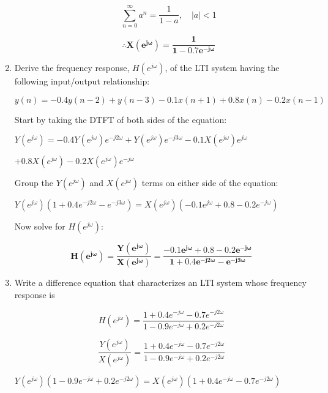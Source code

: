 \documentclass[fleqn]{article}
\begin{document}
\begin{enumerate}[nolistsep]
\begin{enumerate}[nolistsep]
					\begin{equation*}
						\sum_{n=0}^{\infty}a^n = \frac{1}{1-a},\quad |a| < 1
					\end{equation*}
					
					\begin{equation*}
						\mathbf{\therefore X(e^{j\omega}) = \frac{1}{1 - 0.7e^{-j\omega}}}
					\end{equation*}
			\end{enumerate}
		
		\item Derive the frequency response, $H(e^{j\omega})$, of the LTI system having the following input/output relationship:
		
			$y(n) = -0.4y(n-2)+y(n-3)-0.1x(n+1)+0.8x(n)-0.2x(n-1)$
			
			\pagebreak
			Start by taking the DTFT of both sides of the equation:
			
			$Y(e^{j\omega}) = -0.4Y(e^{j\omega})e^{-j2\omega}+Y(e^{j\omega})e^{-j3\omega}-0.1X(e^{j\omega})e^{j\omega}$
			
			$+0.8X(e^{j\omega})-0.2X(e^{j\omega})e^{-j\omega}$
			
			Group the $Y(e^{j\omega})$ and $X(e^{j\omega})$ terms on either side of the equation:
			
			$Y(e^{j\omega})(1 + 0.4e^{-j2\omega} - e^{-j3\omega}) = X(e^{j\omega})(-0.1e^{j\omega} + 0.8 - 0.2e^{-j\omega})$
			
			Now solve for $H(e^{j\omega})$:
			
			\begin{equation*}
				\mathbf{H(e^{j\omega}) = \frac{Y(e^{j\omega})}{X(e^{j\omega})} = \frac{-0.1e^{j\omega} + 0.8 - 0.2e^{-j\omega}}{1 + 0.4e^{-j2\omega} - e^{-j3\omega}}}
			\end{equation*}
		\item Write a difference equation that characterizes an LTI system whose frequency response is
		
			\begin{equation*}
				H(e^{j\omega}) = \frac{1 + 0.4e^{-j\omega} - 0.7e^{-j2\omega}}{1 - 0.9e^{-j\omega} + 0.2e^{-j2\omega}}
			\end{equation*}
			
			\begin{equation*}
				\frac{Y(e^{j\omega})}{X(e^{j\omega})} = \frac{1 + 0.4e^{-j\omega} - 0.7e^{-j2\omega}}{1 - 0.9e^{-j\omega} + 0.2e^{-j2\omega}}
			\end{equation*}
			
			$Y(e^{j\omega})(1 - 0.9e^{-j\omega} + 0.2e^{-j2\omega}) = X(e^{j\omega})(1 + 0.4e^{-j\omega} - 0.7e^{-j2\omega})$
			

\end{enumerate}
\end{document}
